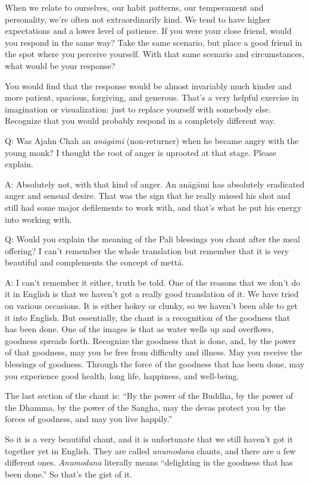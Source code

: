 When we relate to ourselves, our habit patterns, our temperament and
personality, we’re often not extraordinarily kind. We tend to have
higher expectations and a lower level of patience. If you were your
close friend, would you respond in the same way? Take the same scenario,
but place a good friend in the spot where you perceive yourself. With
that same scenario and circumstances, what would be your response?

You would find that the response would be almost invariably much kinder
and more patient, spacious, forgiving, and generous. That’s a very
helpful exercise in imagination or visualization: just to replace
yourself with somebody else. Recognize that you would probably respond
in a completely different way.

\qaspace
Q: Was Ajahn Chah an \emph{anāgāmi} (non-returner) when he became angry
with the young monk? I thought the root of anger is uprooted at that
stage. Please explain.

\qaspace
A: Absolutely not, with that kind of anger. An anāgāmi has absolutely
eradicated anger and sensual desire. That was the sign that he really
missed his shot and still had some major defilements to work with, and
that’s what he put his energy into working with.

\qaspace
Q: Would you explain the meaning of the Pali blessings you chant after
the meal offering? I can’t remember the whole translation but remember
that it is very beautiful and complements the concept of mettā.

\qaspace
A: I can’t remember it either, truth be told. One of the reasons that we
don’t do it in English is that we haven’t got a really good translation
of it. We have tried on various occasions. It is either hokey or clunky,
so we haven’t been able to get it into English. But essentially, the
chant is a recognition of the goodness that has been done. One of the
images is that as water wells up and overflows, goodness spreads forth.
Recognize the goodness that is done, and, by the power of that goodness,
may you be free from difficulty and illness. May you receive the
blessings of goodness. Through the force of the goodness that has been
done, may you experience good health, long life, happiness, and
well-being.

The last section of the chant is: “By the power of the Buddha, by the
power of the Dhamma, by the power of the Sangha, may the devas protect
you by the forces of goodness, and may you live happily.”

So it is a very beautiful chant, and it is unfortunate that we still
haven’t got it together yet in English. They are called \emph{anumodana}
chants, and there are a few different ones. \emph{Anumodana} literally
means “delighting in the goodness that has been done.” So that’s the
gist of it.

